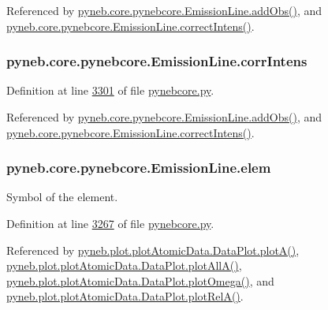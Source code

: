 Referenced by \hyperlink{pynebcore_8py_source_l03347}{pyneb.\+core.\+pynebcore.\+Emission\+Line.\+add\+Obs()}, and \hyperlink{pynebcore_8py_source_l03325}{pyneb.\+core.\+pynebcore.\+Emission\+Line.\+correct\+Intens()}.

\hypertarget{classpyneb_1_1core_1_1pynebcore_1_1_emission_line_a903ce14847b8b13f154d734ffe85c93a}{}
\subsubsection[{corr\+Intens}]{\setlength{\rightskip}{0pt plus 5cm}pyneb.\+core.\+pynebcore.\+Emission\+Line.\+corr\+Intens}\label{classpyneb_1_1core_1_1pynebcore_1_1_emission_line_a903ce14847b8b13f154d734ffe85c93a}


Definition at line \hyperlink{pynebcore_8py_source_l03301}{3301} of file \hyperlink{pynebcore_8py_source}{pynebcore.\+py}.



Referenced by \hyperlink{pynebcore_8py_source_l03347}{pyneb.\+core.\+pynebcore.\+Emission\+Line.\+add\+Obs()}, and \hyperlink{pynebcore_8py_source_l03325}{pyneb.\+core.\+pynebcore.\+Emission\+Line.\+correct\+Intens()}.

\hypertarget{classpyneb_1_1core_1_1pynebcore_1_1_emission_line_a2ae6c54e37a06730bf2b382c966a4694}{}
\subsubsection[{elem}]{\setlength{\rightskip}{0pt plus 5cm}pyneb.\+core.\+pynebcore.\+Emission\+Line.\+elem}\label{classpyneb_1_1core_1_1pynebcore_1_1_emission_line_a2ae6c54e37a06730bf2b382c966a4694}


Symbol of the element. 



Definition at line \hyperlink{pynebcore_8py_source_l03267}{3267} of file \hyperlink{pynebcore_8py_source}{pynebcore.\+py}.



Referenced by \hyperlink{plot_atomic_data_8py_source_l00116}{pyneb.\+plot.\+plot\+Atomic\+Data.\+Data\+Plot.\+plot\+A()}, \hyperlink{plot_atomic_data_8py_source_l00188}{pyneb.\+plot.\+plot\+Atomic\+Data.\+Data\+Plot.\+plot\+All\+A()}, \hyperlink{plot_atomic_data_8py_source_l00372}{pyneb.\+plot.\+plot\+Atomic\+Data.\+Data\+Plot.\+plot\+Omega()}, and \hyperlink{plot_atomic_data_8py_source_l00261}{pyneb.\+plot.\+plot\+Atomic\+Data.\+Data\+Plot.\+plot\+Rel\+A()}.

